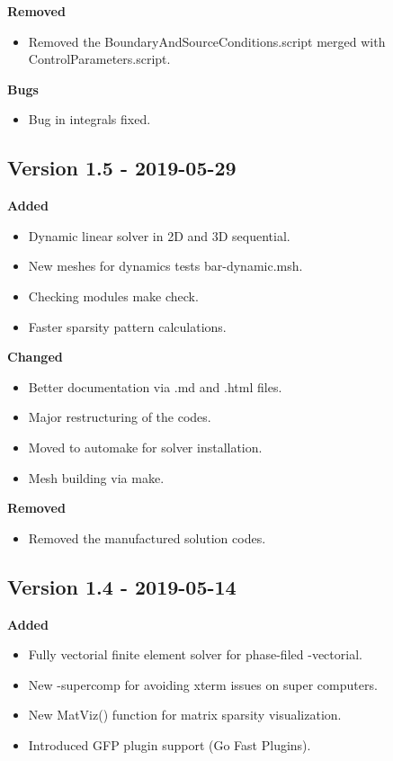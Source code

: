 \documentclass{report}
\begin{document}
\textbf{Removed}
\begin{itemize}
 \item Removed the {\ttfamily BoundaryAndSourceConditions.script} merged with {\ttfamily ControlParameters.script}.
\end{itemize}

\textbf{Bugs}
\begin{itemize}
 \item Bug in integrals fixed.
\end{itemize}


\subsection{Version 1.5 - 2019-05-29}

\textbf{Added}
\begin{itemize}
 \item Dynamic linear solver in 2D and 3D  sequential.
 \item New meshes for dynamics tests {\ttfamily bar-dynamic.msh}.
 \item Checking modules {\ttfamily make check}.
 \item Faster sparsity pattern calculations. 
\end{itemize}

\textbf{Changed}
\begin{itemize}
 \item Better documentation via {\ttfamily.md} and {\ttfamily.html} files.
 \item Major restructuring of the codes. 
 \item Moved to {\ttfamily automake} for solver installation.
 \item Mesh building via {\ttfamily make}.
\end{itemize}

\textbf{Removed}
\begin{itemize}
 \item Removed the manufactured solution codes.
\end{itemize}

\subsection{Version 1.4 - 2019-05-14}

\textbf{Added}
\begin{itemize}
 \item Fully vectorial finite element solver for phase-filed {\ttfamily-vectorial}.
 \item New {\ttfamily-supercomp} for avoiding xterm issues on super computers.
 \item New {\ttfamily MatViz()} function for matrix sparsity visualization.
 \item Introduced  {\ttfamily GFP} plugin support (Go Fast Plugins). 
\end{itemize}
\end{document}
